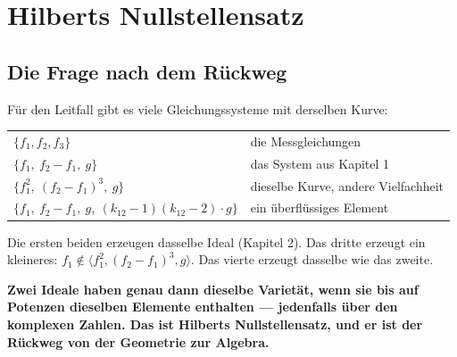 \chapter{Hilberts Nullstellensatz}

\section{Die Frage nach dem Rückweg}

\begin{merksatz}
Für den Leitfall gibt es viele Gleichungssysteme mit derselben Kurve:
\begin{center}
{\small
\renewcommand{\arraystretch}{1.5}
\begin{tabular}{@{}P{4.4cm}P{4.2cm}@{}}
\toprule
$\{f_1, f_2, f_3\}$ & die Messgleichungen\\
$\{f_1,\ f_2 - f_1,\ g\}$ & das System aus Kapitel 1\\
$\{f_1^{2},\ (f_2 - f_1)^{3},\ g\}$ & dieselbe Kurve, andere Vielfachheit\\
$\{f_1,\ f_2 - f_1,\ g,\ (k_{12} - 1)(k_{12} - 2)\cdot g\}$ & ein überflüssiges Element\\
\bottomrule
\end{tabular}}
\end{center}
Die ersten beiden erzeugen dasselbe Ideal (Kapitel 2). Das dritte erzeugt ein kleineres: $f_1\notin\langle f_1^{2}, (f_2 - f_1)^{3}, g\rangle$. Das vierte erzeugt dasselbe wie das zweite.

\begin{center}
\begin{minipage}{0.9\textwidth}
\textbf{Zwei Ideale haben genau dann dieselbe Varietät, wenn sie bis auf Potenzen dieselben Elemente enthalten --- jedenfalls über den komplexen Zahlen. Das ist Hilberts Nullstellensatz, und er ist der Rückweg von der Geometrie zur Algebra.}
\end{minipage}
\end{center}

\begin{center}
\begin{minipage}{0.88\textwidth}
\end{minipage}
\end{center}
\end{merksatz}

